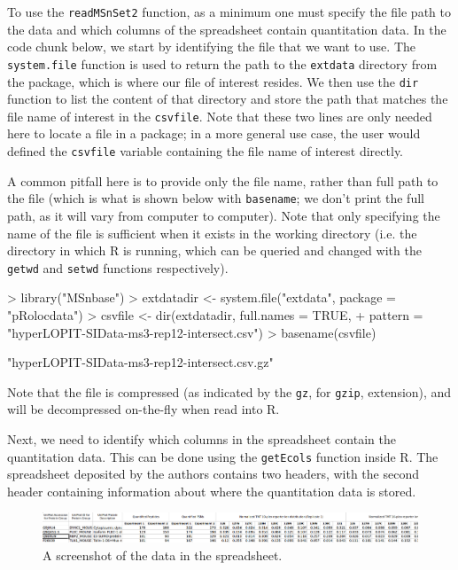 To use the \texttt{readMSnSet2} function, as a minimum one must
specify the file path to the data and which columns of the spreadsheet
contain quantitation data. In the code chunk below, we start by
identifying the file that we want to use. The \texttt{system.file}
function is used to return the path to the \texttt{extdata} directory
from the  package, which is where our file of
interest resides. We then use the \texttt{dir} function to list the
content of that directory and store the path that matches the file
name of interest in the \texttt{csvfile}. Note that these two lines
are only needed here to locate a file in a package; in a more general
use case, the user would defined the \texttt{csvfile} variable
containing the file name of interest directly.

A common pitfall here is to provide only the file name, rather than
full path to the file (which is what is shown below with
\texttt{basename}; we don't print the full path, as it will vary from
computer to computer). Note that only specifying the name of the file
is sufficient when it exists in the working directory (i.e. the
directory in which R is running, which can be queried and changed with
the \texttt{getwd} and \texttt{setwd} functions respectively).

\begin{Schunk}
\begin{Sinput}
> library("MSnbase")
> extdatadir <- system.file("extdata", package = "pRolocdata")
> csvfile <- dir(extdatadir, full.names = TRUE,
+           pattern = "hyperLOPIT-SIData-ms3-rep12-intersect.csv")
> basename(csvfile)
\end{Sinput}
\begin{Soutput}
[1] "hyperLOPIT-SIData-ms3-rep12-intersect.csv.gz"
\end{Soutput}
\end{Schunk}

Note that the file is compressed (as indicated by the \texttt{gz}, for
\texttt{gzip}, extension), and will be decompressed on-the-fly when
read into R.

Next, we need to identify which columns in the spreadsheet contain the
quantitation data. This can be done using the \texttt{getEcols}
function inside R. The spreadsheet deposited by the authors contains
two headers, with the second header containing information about where
the quantitation data is stored.

\begin{figure}[!ht]
  \centering
  \includegraphics[width=.85\textwidth]{./Figures/spreadsheet-screenshot.png}
  \caption{A screenshot of the data in the spreadsheet.}
  \label{fig:spreadsheet}
\end{figure}


